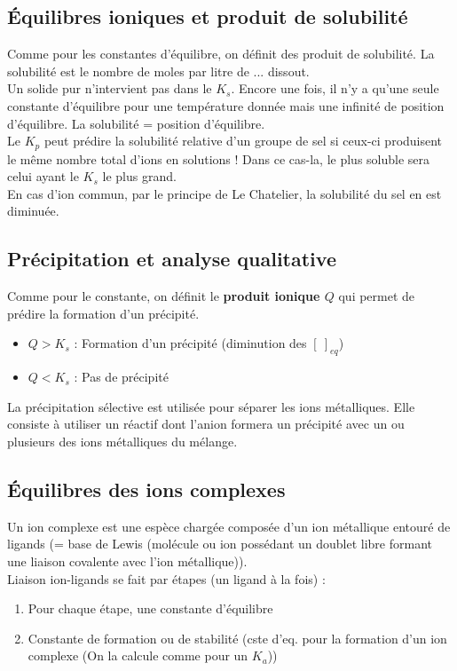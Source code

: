 \documentclass[12pt, a4paper]{article}
\begin{document}
\subsection{Équilibres ioniques et produit de solubilité}
Comme pour les constantes d'équilibre, on définit des produit de solubilité. La solubilité est le nombre de moles par litre de ... dissout.\\
Un solide pur n'intervient pas dans le $K_s$. Encore une fois, il n'y a qu'une seule constante d'équilibre pour une température donnée mais une infinité de position d'équilibre. La solubilité = position d'équilibre. \\

Le $K_p$ peut prédire la solubilité relative d'un groupe de sel si ceux-ci produisent le même nombre total d'ions en solutions ! Dans ce cas-la, le plus soluble sera celui ayant le $K_s$ le plus grand.\\

En cas d'ion commun, par le principe de Le Chatelier, la solubilité du sel en est diminuée. 

\subsection{Précipitation et analyse qualitative}
Comme pour le constante, on définit le \textbf{produit ionique $Q$} qui permet de prédire la formation d'un précipité.
\begin{itemize}
\item $Q > K_s$ : Formation d'un précipité (diminution des $[\ ]_{eq}$)
\item $Q < K_s$ : Pas de précipité
\end{itemize}
La précipitation sélective est utilisée pour séparer les ions métalliques. Elle consiste à utiliser un réactif dont l'anion formera un précipité avec un ou plusieurs des ions métalliques du mélange. 

\subsection{Équilibres des ions complexes}
Un ion complexe est une espèce chargée composée d'un ion métallique entouré de ligands (= base de Lewis (molécule ou ion possédant un doublet libre formant une liaison covalente avec l'ion métallique)).\\
Liaison ion-ligands se fait par étapes (un ligand à la fois) :
\begin{enumerate}
\item Pour chaque étape, une constante d'équilibre
\item Constante de formation ou de stabilité (cste d'eq. pour la formation d'un ion complexe (On la calcule comme pour un $K_a$))
\end{enumerate}
\end{document}
